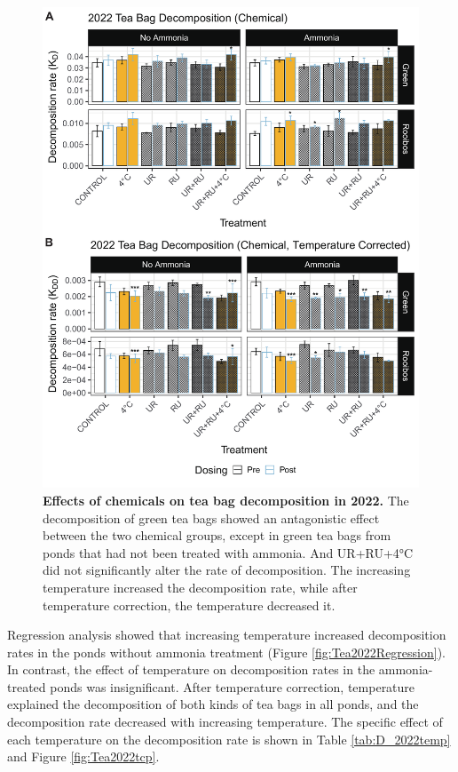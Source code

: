 \documentclass[11pt, a4paper]{article}
\begin{document}
\begin{spacing}{1.5}
\begin{figure}[H]
    \centering
    \includegraphics[scale=0.55]{./Figures/Tea2022_Treat_bar}
    \caption{\textbf{Effects of chemicals on tea bag decomposition in 2022.} The decomposition of green tea bags showed an antagonistic effect between the two chemical groups, except in green tea bags from ponds that had not been treated with ammonia. And UR+RU+4°C did not significantly alter the rate of decomposition. The increasing temperature increased the decomposition rate, while after temperature correction, the temperature decreased it.}
    \label{fig:Tea2022ccp}
\end{figure}

Regression analysis showed that increasing temperature increased decomposition rates in the ponds without ammonia treatment (Figure \ref{fig:Tea2022Regression}). In contrast, the effect of temperature on decomposition rates in the ammonia-treated ponds was insignificant. After temperature correction, temperature explained the decomposition of both kinds of tea bags in all ponds, and the decomposition rate decreased with increasing temperature. The specific effect of each temperature on the decomposition rate is shown in Table \ref{tab:D_2022temp} and Figure \ref{fig:Tea2022tcp}.


\end{spacing}
\end{document}
